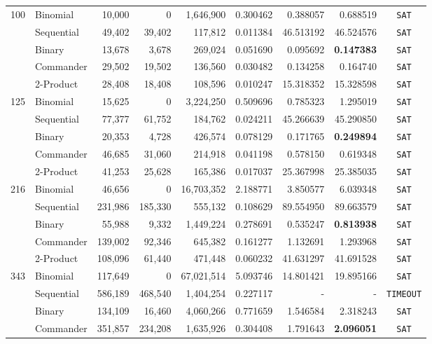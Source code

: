 \documentclass[a4paper,fleqn]{cas-sc}
\begin{document}
\begin{longtable}{r l r r r r r r c}
\midrule
\multirow{5}{*}{100} 
 & Binomial & 10,000 & 0 & 1,646,900 & 0.300462 & 0.388057 & 0.688519 & \texttt{SAT} \\
 & Sequential & 49,402 & 39,402 & 117,812 & 0.011384 & 46.513192 & 46.524576 & \texttt{SAT} \\
 & Binary & 13,678 & 3,678 & 269,024 & 0.051690 & 0.095692 & \textbf{0.147383} & \texttt{SAT} \\
 & Commander & 29,502 & 19,502 & 136,560 & 0.030482 & 0.134258 & 0.164740 & \texttt{SAT} \\
 & 2-Product & 28,408 & 18,408 & 108,596 & 0.010247 & 15.318352 & 15.328598 & \texttt{SAT} \\
\midrule
\multirow{5}{*}{125} 
 & Binomial & 15,625 & 0 & 3,224,250 & 0.509696 & 0.785323 & 1.295019 & \texttt{SAT} \\
 & Sequential & 77,377 & 61,752 & 184,762 & 0.024211 & 45.266639 & 45.290850 & \texttt{SAT} \\
 & Binary & 20,353 & 4,728 & 426,574 & 0.078129 & 0.171765 & \textbf{0.249894} & \texttt{SAT} \\
 & Commander & 46,685 & 31,060 & 214,918 & 0.041198 & 0.578150 & 0.619348 & \texttt{SAT} \\
 & 2-Product & 41,253 & 25,628 & 165,386 & 0.017037 & 25.367998 & 25.385035 & \texttt{SAT} \\
\midrule
\multirow{5}{*}{216} 
 & Binomial & 46,656 & 0 & 16,703,352 & 2.188771 & 3.850577 & 6.039348 & \texttt{SAT} \\
 & Sequential & 231,986 & 185,330 & 555,132 & 0.108629 & 89.554950 & 89.663579 & \texttt{SAT} \\
 & Binary & 55,988 & 9,332 & 1,449,224 & 0.278691 & 0.535247 & \textbf{0.813938} & \texttt{SAT} \\
 & Commander & 139,002 & 92,346 & 645,382 & 0.161277 & 1.132691 & 1.293968 & \texttt{SAT} \\
 & 2-Product & 108,096 & 61,440 & 471,448 & 0.060232 & 41.631297 & 41.691528 & \texttt{SAT} \\
\midrule
\multirow{5}{*}{343} 
 & Binomial & 117,649 & 0 & 67,021,514 & 5.093746 & 14.801421 & 19.895166 & \texttt{SAT} \\
 & Sequential & 586,189 & 468,540 & 1,404,254 & 0.227117 & - & - & \texttt{TIMEOUT} \\
 & Binary & 134,109 & 16,460 & 4,060,266 & 0.771659 & 1.546584 & 2.318243 & \texttt{SAT} \\
 & Commander & 351,857 & 234,208 & 1,635,926 & 0.304408 & 1.791643 & \textbf{2.096051} & \texttt{SAT} \\

\end{longtable}
\end{document}
